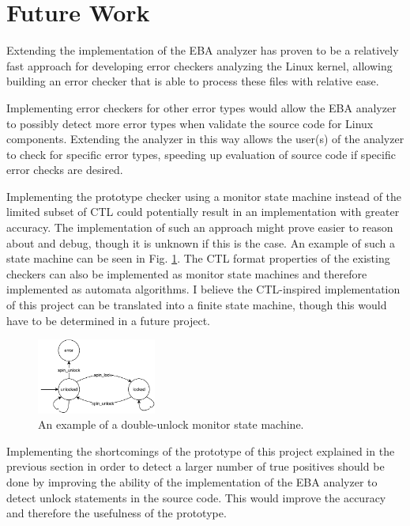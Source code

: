 \section{Future Work}

\newpar Extending the implementation of the EBA analyzer has proven to be a relatively fast approach for developing error checkers analyzing the Linux kernel, allowing building an error checker that is able to process these files with relative ease. 

\newpar Implementing error checkers for other error types would allow the EBA analyzer to possibly detect more error types when validate the source code for Linux components. Extending the analyzer in this way allows the user(s) of the analyzer to check for specific error types, speeding up evaluation of source code if specific error checks are desired. 

\newpar Implementing the prototype checker using a monitor state machine instead of the limited subset of CTL could potentially result in an implementation with greater accuracy. The implementation of such an approach might prove easier to reason about and debug, though it is unknown if this is the case. An example of such a state machine can be seen in Fig. \ref{fig:statemachine}. The CTL format properties of the existing checkers can also be implemented as monitor state machines and therefore implemented as automata algorithms. I believe the CTL-inspired implementation of this project can be translated into a finite state machine, though this would have to be determined in a future project. 

\begin{figure}[h]
    \centering
    \includegraphics[width=0.35\textwidth]{futurework/figures/state-machine}
    \caption{An example of a double-unlock monitor state machine.}
    \label{fig:statemachine}
\end{figure}

\newpar Implementing the shortcomings of the prototype of this project explained in the previous section in order to detect a larger number of true positives should be done by improving the ability of the implementation of the EBA analyzer to detect unlock statements in the source code. This would improve the accuracy and therefore the usefulness of the prototype.

